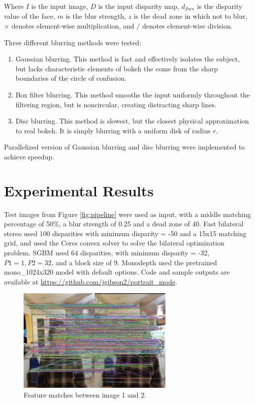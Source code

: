\documentclass[10pt,twocolumn,letterpaper]{article}
\begin{document}
Where $I$ is the input image, $D$ is the input disparity map, $d_{\textit{face}}$ is the disparity value of the face, $m$ is the blur strength, $z$ is the dead zone in which not to blur, $\times$ denotes element-wise multiplication, and $/$ denotes element-wise division.

Three different blurring methods were tested:

\begin{enumerate}
    \item Gaussian blurring. This method is fast and effectively isolates the subject, but lacks characteristic elements of bokeh the come from the sharp boundaries of the circle of confusion.
    \item Box filter blurring. This method smooths the input uniformly throughout the filtering region, but is noncircular, creating distracting sharp lines.
    \item Disc blurring. This method is slowest, but the closest physical approximation to real bokeh. It is simply blurring with a uniform disk of radius $r$.
\end{enumerate}

Parallelized version of Gaussian blurring and disc blurring were implemented to achieve speedup.

\section{Experimental Results}

\par Test images from Figure \ref{fig:pipeline} were used as input, with a middle matching percentage of 50\%, a blur strength of 0.25 and a dead zone of 40. Fast bilateral stereo used 100 disparities with minimum disparity = -50 and a 15x15
matching grid, and used the Ceres convex solver to solve the bilateral optimization problem. SGBM used 64 disparities, with minimum disparity = -32, $P1 = 1, P2 = 32$, and a block size of 9. Monodepth used the pretrained mono\_1024x320 model with default options.
Code and sample outputs are available at \url{https://github.com/jgibson2/portrait_mode}.
\begin{figure}[!t]
    \begin{center}
        \includegraphics[width=3.0in]{bin/feature_matches.jpg} %
    \end{center}
    \caption{Feature matches between image 1 and 2.}
    \label{fig:features}
\end{figure}
\end{document}
